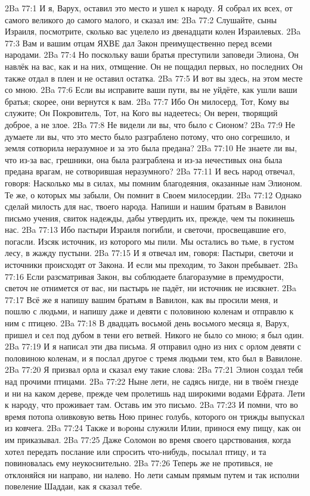 \vs 2Ba 77:1
И я, Варух, оставил это место и ушел к народу. Я собрал их всех, от самого великого до самого малого, и сказал им:
\vs 2Ba 77:2
Слушайте, сыны Израиля, посмотрите, сколько вас уцелело из двенадцати колен Израилевых.
\vs 2Ba 77:3
Вам и вашим отцам ЯХВЕ дал Закон преимущественно перед всеми народами.
\vs 2Ba 77:4
Но поскольку ваши братья преступили заповеди Элиона, Он навлёк на вас, как и на них, отмщение. Он не пощадил первых, но последних Он также отдал в плен и не оставил остатка.
\vs 2Ba 77:5
И вот вы здесь, на этом месте со мною.
\vs 2Ba 77:6
Если вы исправите ваши пути, вы не уйдёте, как ушли ваши братья; скорее, они вернутся к вам.
\vs 2Ba 77:7
Ибо Он милосерд, Тот, Кому вы служите; Он Покровитель, Тот, на Кого вы надеетесь; Он верен, творящий доброе, а не злое.
\vs 2Ba 77:8
Не видели ли вы, что было с Сионом?
\vs 2Ba 77:9
Не думаете ли вы, что это место было разграблено потому, что оно согрешило, и земля сотворила неразумное и за это была предана?
\vs 2Ba 77:10
Не знаете ли вы, что из-за вас, грешники, она была разграблена и из-за нечестивых она была предана врагам, не сотворившая неразумного?
\vs 2Ba 77:11
И весь народ отвечал, говоря: Насколько мы в силах, мы помним благодеяния, оказанные нам Элионом. Те же, о которых мы забыли, Он помнит в Своем милосердии.
\vs 2Ba 77:12
Однако сделай милость для нас, твоего народа. Напиши и нашим братьям в Вавилон письмо учения, свиток надежды, дабы утвердить их, прежде, чем ты покинешь нас.
\vs 2Ba 77:13
Ибо пастыри Израиля погибли, и светочи, просвещавшие его, погасли. Изсяк источник, из которого мы пили. Мы остались во тьме, в густом лесу, в жажду пустыни.
\vs 2Ba 77:15
И я отвечал им, говоря: Пастыри, светочи и источники происходят от Закона. И если мы преходим, то Закон пребывает.
\vs 2Ba 77:16
Если разсматривая Закон, вы соблюдаете благоразумие в премудрости, светоч не отнимется от вас, ни пастырь не падёт, ни источник не изсякнет.
\vs 2Ba 77:17
Всё же я напишу вашим братьям в Вавилон, как вы просили меня, и пошлю с людьми, и напишу даже и девяти с половиною коленам и отправлю к ним с птицею.
\vs 2Ba 77:18
В двадцать восьмой день восьмого месяца я, Варух, пришел и сел под дубом в тени его ветвей. Никого не было со мною; я был один.
\vs 2Ba 77:19
И я написал эти два письма. Я отправил одно из них с орлом девяти с половиною коленам, и я послал другое с тремя людьми тем, кто был в Вавилоне.
\vs 2Ba 77:20
Я призвал орла и сказал ему такие слова:
\vs 2Ba 77:21
Элион создал тебя над прочими птицами.
\vs 2Ba 77:22
Ныне лети, не садясь нигде, ни в твоём гнезде и ни на каком дереве, прежде чем пролетишь над широкими водами Ефрата. Лети к народу, что проживает там. Оставь им это письмо.
\vs 2Ba 77:23
И помни, что во время потопа оливковую ветвь Ною принес голубь, которого он трижды выпускал из ковчега.
\vs 2Ba 77:24
Также и вoроны служили Илии, принося ему пищу, как он им приказывал.
\vs 2Ba 77:25
Даже Соломон во время своего царствования, когда хотел передать послание или спросить что-нибудь, посылал птицу, и та повиновалась ему неукоснительно.
\vs 2Ba 77:26
Теперь же не противься, не отклоняйся ни направо, ни налево. Но лети самым прямым путем и так исполни повеление Шаддаи, как я сказал тебе.

